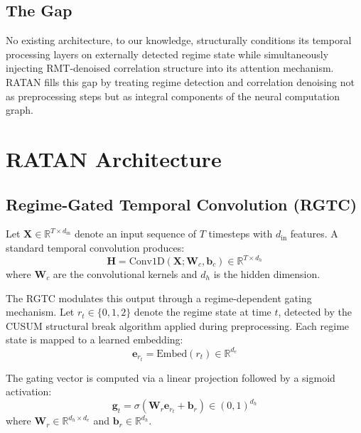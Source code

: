 \documentclass[conference]{IEEEtran}
\begin{document}
\subsection{The Gap}

No existing architecture, to our knowledge, structurally conditions its temporal processing layers on externally detected regime state while simultaneously injecting RMT-denoised correlation structure into its attention mechanism. RATAN fills this gap by treating regime detection and correlation denoising not as preprocessing steps but as integral components of the neural computation graph.

\section{RATAN Architecture}
\label{sec:architecture}

\subsection{Regime-Gated Temporal Convolution (RGTC)}
\label{sec:rgtc}

Let $\mathbf{X} \in \mathbb{R}^{T \times d_{\text{in}}}$ denote an input sequence of $T$ timesteps with $d_{\text{in}}$ features. A standard temporal convolution produces:
\begin{equation}
\mathbf{H} = \text{Conv1D}(\mathbf{X}; \mathbf{W}_c, \mathbf{b}_c) \in \mathbb{R}^{T \times d_h}
\end{equation}
where $\mathbf{W}_c$ are the convolutional kernels and $d_h$ is the hidden dimension.

The RGTC modulates this output through a regime-dependent gating mechanism. Let $r_t \in \{0, 1, 2\}$ denote the regime state at time $t$, detected by the CUSUM structural break algorithm applied during preprocessing. Each regime state is mapped to a learned embedding:
\begin{equation}
\mathbf{e}_{r_t} = \text{Embed}(r_t) \in \mathbb{R}^{d_e}
\end{equation}

The gating vector is computed via a linear projection followed by a sigmoid activation:
\begin{equation}
\mathbf{g}_t = \sigma(\mathbf{W}_r \mathbf{e}_{r_t} + \mathbf{b}_r) \in (0, 1)^{d_h}
\end{equation}
where $\mathbf{W}_r \in \mathbb{R}^{d_h \times d_e}$ and $\mathbf{b}_r \in \mathbb{R}^{d_h}$.
\end{document}
